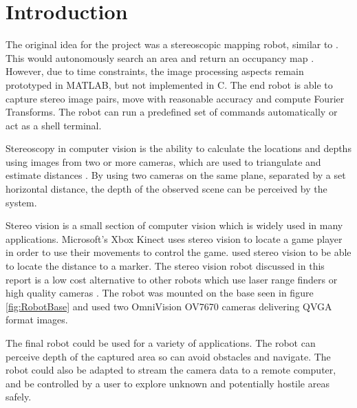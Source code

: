 \chapter{Introduction} \label{Chapter:Introduction}

%
%
%
%


The original idea for the project was a stereoscopic mapping robot, similar to \cite{Pirobot}. This would autonomously search an area and return an occupancy map \citep{thrun2003learning}. However, due to time constraints, the image processing aspects remain prototyped in MATLAB, but not implemented in C. The end robot is able to capture stereo image pairs, move with reasonable accuracy and compute Fourier Transforms. The robot can run a predefined set of commands automatically or act as a shell terminal.

Stereoscopy in computer vision is the ability to calculate the locations and depths using images from two or more cameras, which are used to triangulate and estimate distances \citep{Saxena:DepthEstimation}. By using two cameras on the same plane, separated by a set horizontal distance, the depth of the observed scene can be perceived by the system.

Stereo vision is a small section of computer vision which is widely used in many applications. Microsoft's Xbox Kinect \citep{Microsoft:Kinect} uses stereo vision to locate a game player in order to use their movements to control the game. \cite{Mrovlje:Distance_Stereoscopic} used stereo vision to be able to locate the distance to a marker. 
The stereo vision robot discussed in this report is a low cost alternative to other robots which use laser range finders or high quality cameras \citep{Se:MappingRobot}. The robot was mounted on the base seen in figure \ref{fig:RobotBase} and used two OmniVision OV7670 cameras delivering QVGA format images.

The final robot could be used for a variety of applications. The robot can perceive depth of the captured area so can avoid obstacles and navigate. The robot could also be adapted to stream the camera data to a remote computer, and be controlled by a user to explore unknown and potentially hostile areas safely. 

